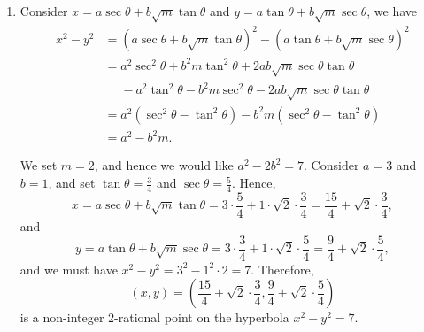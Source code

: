 \begin{enumerate}
\begin{enumerate}
              \item Consider \(x = a \sec \theta + b \sqrt{m} \tan \theta\) and \(y = a \tan \theta + b \sqrt{m} \sec \theta\), we have
                    \begin{align*}
                        x^2 - y^2 & = \left(a \sec \theta + b \sqrt{m} \tan \theta\right)^2 - \left(a \tan \theta + b \sqrt{m} \sec \theta\right)^2 \\
                                  & = a^2 \sec^2 \theta + b^2 m \tan^2\theta + 2ab\sqrt{m} \sec \theta \tan \theta                                  \\
                                  & \phantom{=} - a^2 \tan^2\theta - b^2 m \sec^2\theta - 2ab\sqrt{m} \sec \theta \tan \theta                       \\
                                  & = a^2 (\sec^2 \theta - \tan^2 \theta) - b^2 m (\sec^2 \theta - \tan^2 \theta)                                   \\
                                  & = a^2 - b^2 m.
                    \end{align*}

                    We set \(m = 2\), and hence we would like \(a^2 - 2 b^2 = 7\). Consider \(a = 3\) and \(b = 1\), and set \(\tan \theta = \frac{3}{4}\) and \(\sec \theta = \frac{5}{4}\). Hence,
                    \[
                        x = a \sec \theta + b \sqrt{m} \tan \theta = 3 \cdot \frac{5}{4} + 1 \cdot \sqrt{2} \cdot \frac{3}{4} = \frac{15}{4} + \sqrt{2} \cdot \frac{3}{4},
                    \]
                    and
                    \[
                        y = a \tan \theta + b \sqrt{m} \sec \theta = 3 \cdot \frac{3}{4} + 1 \cdot \sqrt{2} \cdot \frac{5}{4} = \frac{9}{4} + \sqrt{2} \cdot \frac{5}{4},
                    \]
                    and we must have \(x^2 - y^2 = 3^2 - 1^2 \cdot 2 = 7\). Therefore,
                    \[
                        (x, y) = \left(\frac{15}{4} + \sqrt{2} \cdot \frac{3}{4}, \frac{9}{4} + \sqrt{2} \cdot \frac{5}{4}\right)
                    \]
                    is a non-integer \(2\)-rational point on the hyperbola \(x^2 - y^2 = 7\).
          \end{enumerate}
\end{enumerate}